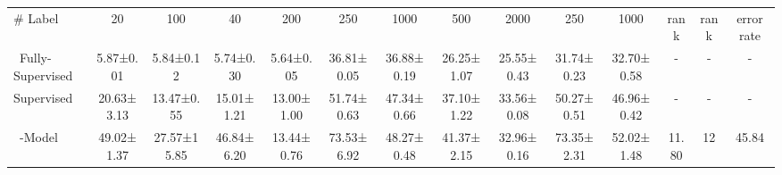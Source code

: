 \documentclass{article}
\begin{document}
\begin{table}[t!]
{\begin{tabular}{l|cc|cc|cc|cc|cc|c|c|c}
\# Label & \multicolumn{1}{c}{20} & \multicolumn{1}{c|}{100} & \multicolumn{1}{c}{40}  & \multicolumn{1}{c|}{200} & \multicolumn{1}{c}{250}  & \multicolumn{1}{c|}{1000}   &  \multicolumn{1}{c}{500}  & \multicolumn{1}{c|}{2000} & 
\multicolumn{1}{c}{250}  & \multicolumn{1}{c|}{1000} & \multicolumn{1}{c|}{rank}   & 
\multicolumn{1}{c|}{rank} & \multicolumn{1}{c}{error rate}\\ \cmidrule(r){1-1}\cmidrule(lr){2-3}\cmidrule(lr){4-5}\cmidrule(lr){6-7}\cmidrule(lr){8-9}\cmidrule(lr){10-11}\cmidrule(l){12-12}\cmidrule(l){13-13} \cmidrule(l){14-14}\,
Fully-Supervised & 5.87\tiny{±0.01}                       & 5.84\tiny{±0.12}                        & 5.74\tiny{±0.30}                        & 5.64\tiny{±0.05}                         & 36.81\tiny{±0.05}                              & 36.88\tiny{±0.19}                               & 26.25\tiny{±1.07}                              & 25.55\tiny{±0.43}                               & 31.74\tiny{±0.23}                            & 32.70\tiny{±0.58}                             & -                                  & -                               & -                                    \\
Supervised       & 20.63\tiny{±3.13}                      & 13.47\tiny{±0.55}                       & 15.01\tiny{±1.21}                       & 13.00\tiny{±1.00}                        & 51.74\tiny{±0.63}                              & 47.34\tiny{±0.66}                               & 37.10\tiny{±1.22}                              & 33.56\tiny{±0.08}                               & 50.27\tiny{±0.51}                            & 46.96\tiny{±0.42}                             & -                                  & -                               &  -                                   \\
\cmidrule(r){1-1}\cmidrule(lr){2-3}\cmidrule(lr){4-5}\cmidrule(lr){6-7}\cmidrule(lr){8-9}\cmidrule(lr){10-11}\cmidrule(l){12-12}\cmidrule(l){13-13} \cmidrule(l){14-14}\,
-Model         & 49.02\tiny{±1.37}                      & 27.57\tiny{±15.85}                      & 46.84\tiny{±6.20}                       & 13.44\tiny{±0.76}                        & 73.53\tiny{±6.92}                              & 48.27\tiny{±0.48}                               & 41.37\tiny{±2.15}                              & 32.96\tiny{±0.16}                               & 73.35\tiny{±2.31}                            & 52.02\tiny{±1.48}                             & 11.80                             & 12                             & 45.84                               \\

\end{tabular}}
\end{table}
\end{document}
